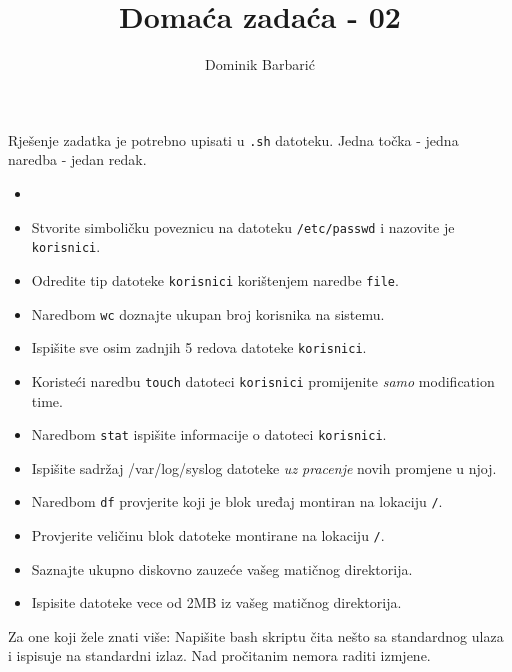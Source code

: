 \documentclass[12pt,a4paper]{article}
\newcommand{\shell}[1]{\texttt{#1}}
\begin{document}
	\title{Domaća zadaća - 02}
	\author{Dominik Barbarić}
	\maketitle
	Rješenje zadatka je potrebno upisati u \shell{.sh} datoteku. Jedna točka - jedna naredba - jedan redak.
	\begin{itemize}
	\item[]
		\item Stvorite simboličku poveznicu na datoteku \shell{/etc/passwd} i nazovite je \shell{korisnici}.
		\item Odredite tip datoteke \shell{korisnici} korištenjem naredbe \shell{file}.
		\item Naredbom \shell{wc} doznajte ukupan broj korisnika na sistemu.
		\item Ispišite sve osim zadnjih 5 redova datoteke \shell{korisnici}.
		\item Koristeći naredbu \shell{touch} datoteci \shell{korisnici} promijenite \emph{samo} modification time.
		\item Naredbom \shell{stat} ispišite informacije o datoteci \shell{korisnici}.
    \item Ispišite sadržaj /var/log/syslog datoteke \emph{uz pracenje} novih promjene u njoj.
		\item Naredbom \shell{df} provjerite koji je blok uređaj montiran na lokaciju \shell{/}.
		\item Provjerite veličinu blok datoteke montirane na lokaciju \shell{/}.
		\item Saznajte ukupno diskovno zauzeće vašeg matičnog direktorija.
    \item Ispisite datoteke vece od 2MB iz vašeg matičnog direktorija. 
	\end{itemize}
  Za one koji žele znati više: Napišite bash skriptu čita nešto sa standardnog ulaza i ispisuje na standardni izlaz. Nad pročitanim nemora raditi izmjene.
\end{document}
